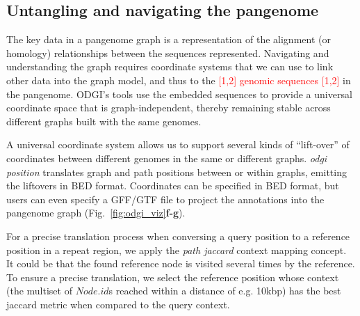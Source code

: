\documentclass{bioinfo}
\newcommand{\REVIEWED}[1]{{\textcolor{Red}{#1}}}
\begin{document}
\subsection{Untangling and navigating the pangenome}
\label{sec:untangle}


The key data in a pangenome graph is a representation of the alignment (or homology) relationships between the sequences represented.
Navigating and understanding the graph requires coordinate systems that we can use to link other data into the graph model, and thus to the \REVIEWED{[1,2] genomic sequences [1,2]} in the pangenome.
ODGI's tools use the embedded sequences to provide a universal coordinate space that is graph-independent, thereby remaining stable across different graphs built with the same genomes.

A universal coordinate system allows us to support several kinds of ``lift-over'' of coordinates between different genomes in the same or different graphs.
\textit{odgi position} translates graph and path positions between or within graphs, emitting the liftovers in BED format.
Coordinates can be specified in BED format, but users can even specify a GFF/GTF file to project the annotations into the pangenome graph (Fig.~\ref{fig:odgi_viz}\textbf{f-g}). 

For a precise translation process when conversing a query position to a reference position in a repeat region, we apply the \textit{path jaccard} context mapping concept.
It could be that the found reference node is visited several times by the reference.
To ensure a precise translation, we select the reference position whose context (the multiset of $Node.id$s reached within a distance of e.g. 10kbp) has the best jaccard metric when compared to the query context.
\end{document}
